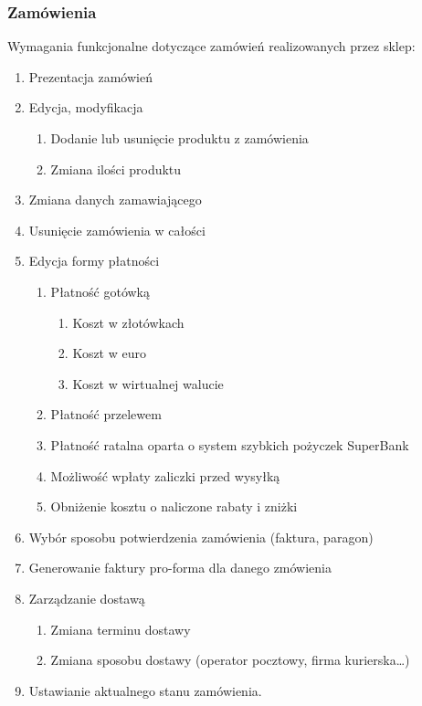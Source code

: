 \subsubsection{Zamówienia}

Wymagania funkcjonalne dotyczące zamówień realizowanych przez sklep:

\begin{enumerate}
  \item Prezentacja zamówień
  \item Edycja, modyfikacja
  \begin{enumerate}
    \item Dodanie lub usunięcie produktu z zamówienia
    \item Zmiana ilości produktu
  \end{enumerate}
  \item Zmiana danych zamawiającego
  \item Usunięcie zamówienia w całości
  \item Edycja formy płatności
  \begin{enumerate}
    \item Płatność gotówką
    \begin{enumerate}
      \item Koszt w złotówkach
      \item Koszt w euro
      \item Koszt w wirtualnej walucie
    \end{enumerate}
    \item Płatność przelewem
    \item Płatność ratalna oparta o system szybkich pożyczek SuperBank
    \item Możliwość wpłaty zaliczki przed wysyłką
    \item Obniżenie kosztu o naliczone rabaty i zniżki
  \end{enumerate}
  \item Wybór sposobu potwierdzenia zamówienia (faktura, paragon)
  \item Generowanie faktury pro-forma dla danego zmówienia
  \item Zarządzanie dostawą
  \begin{enumerate}
    \item Zmiana terminu dostawy
    \item Zmiana sposobu dostawy (operator pocztowy, firma kurierska\ldots)
  \end{enumerate}
  \item Ustawianie aktualnego stanu zamówienia.
\end{enumerate}